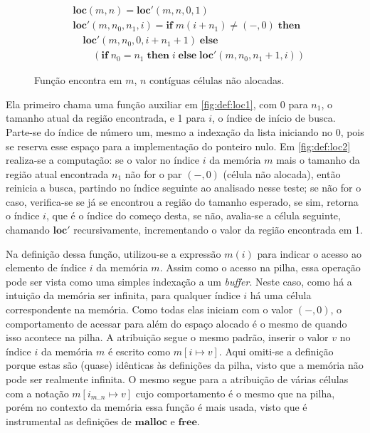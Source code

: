 \begin{figure}[ht]
	\begin{align}
	&\mathbf{loc}(m,n) = \mathbf{loc}'(m, n, 0, 1) \label{fig:def:loc1}\\
	& \mathbf{loc}'(m, n_0 , n_1, i) = \mathbf{if}\; m(i + n_1) \neq (-,0) \; \mathbf{then}\nonumber \\
	&\quad\mathbf{loc}'(m, n_0, 0, i + n_1 + 1)\; \mathbf{else} \nonumber\\
	&\quad\quad(\mathbf{if}\; n_0 = n_1 \; \mathbf{then}\; i \;\mathbf{else}\; \mathbf{loc}'(m, n_0, n_1 + 1, i)) \label{fig:def:loc2}
	\end{align}
	\caption{Função encontra em $m$, $n$ contíguas células não alocadas.}
	\label{fig:def:loc}
\end{figure}

\noindent Ela primeiro chama uma função auxiliar em \ref{fig:def:loc1}, com 0 para $n_1$, o tamanho atual da região encontrada,  e 1 para $i$, o índice de início de busca. Parte-se do índice de número um, mesmo a indexação da lista iniciando no 0, pois se reserva esse espaço para a implementação do ponteiro nulo. Em \ref{fig:def:loc2} realiza-se a computação: se o valor no índice $i$ da memória $m$ mais o tamanho da região atual encontrada $n_1$ não for o par $(-,0)$ (célula não alocada), então reinicia a busca, partindo no índice seguinte ao analisado nesse teste; se não for o caso, verifica-se se já se encontrou a região do tamanho esperado, se sim, retorna o índice $i$, que é o índice do começo desta, se não, avalia-se a célula seguinte, chamando $\mathbf{loc}'$ recursivamente, incrementando o valor da região encontrada em 1.

Na definição dessa função, utilizou-se a expressão $m(i)$ para indicar o acesso ao elemento de índice $i$ da memória $m$. Assim como o acesso na pilha, essa operação pode ser vista como uma simples indexação a um \emph{buffer}. Neste caso, como há a intuição da memória ser infinita, para qualquer índice $i$ há uma célula correspondente na memória. Como todas elas iniciam com o valor $(-,0)$, o comportamento de acessar para além do espaço alocado é o mesmo de quando isso acontece na pilha. A atribuição segue o mesmo padrão, inserir o valor $v$ no índice $i$ da memória $m$ é escrito como $m[i \mapsto v]$. Aqui omiti-se a definição porque estas são (quase) idênticas às definições da pilha, visto que a memória não pode ser realmente infinita. O mesmo segue para a atribuição de várias células com a notação $m[i_{m..n} \mapsto v]$ cujo comportamento é o mesmo que na pilha, porém no contexto da memória essa função é mais usada, visto que é  instrumental as definições de $\mathbf{malloc}$ e $\mathbf{free}$.


